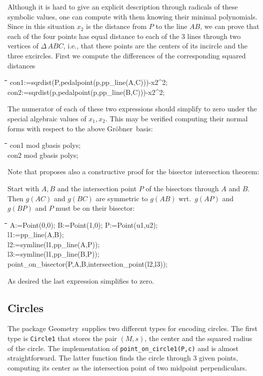 \documentclass{article}
\newenvironment{code}{\tt \begin{tabbing}
\hspace*{1cm}\=\hspace*{1cm}\=\hspace*{1cm}\=
\hspace*{1cm}\=\hspace*{1cm}\=\kill
}{\end{tabbing}}
\newcommand{\geo}{{\sc Geometry}}
\newcommand{\gr}{{Gr\"obner}}
\begin{document}
Although it is hard to give an explicit description through radicals
of these symbolic values, one can compute with them knowing their
minimal polynomials. Since in this situation $x_2$ is the distance
from $P$ to the line $AB$, we can prove that each of the four points
has equal distance to each of the 3 lines through two vertices of
$\Delta\,ABC$, i.e., that these points are the centers of its incircle
and the three excircles. First we compute the differences of the
corresponding squared distances
\begin{code}\>\+
con1:=sqrdist(P,pedalpoint(p,pp\_line(A,C)))-x2\^{}2;\\
con2:=sqrdist(p,pedalpoint(p,pp\_line(B,C)))-x2\^{}2;
\end{code}
The numerator of each of these two expressions should simplify to zero
under the special algebraic values of $x_1,x_2$. This may be verified
computing their normal forms with respect to the above \gr\ basis: 
\begin{code}\>\+
con1 mod gbasis polys;\\
con2 mod gbasis polys;
\end{code}
Note that \cite{Wu:94} proposes also a constructive proof for the
bisector intersection theorem:

Start with $A,B$ and the intersection point $P$ of the bisectors
through $A$ and $B$. Then $g(AC)$ and $g(BC)$ are symmetric to $g(AB)$
wrt.\ $g(AP)$ and $g(BP)$ and $P$ must be on their bisector:
\begin{code}\>\+
A:=Point(0,0); B:=Point(1,0); P:=Point(u1,u2);\\
l1:=pp\_line(A,B);\\
l2:=symline(l1,pp\_line(A,P));\\
l3:=symline(l1,pp\_line(B,P));\\[6pt]

point\_on\_bisector(P,A,B,intersection\_point(l2,l3));
\end{code}
As desired the last expression simplifies to zero.


\subsection{Circles}

The package \geo\ supplies two different types for encoding circles.
The first type is {\tt Circle1} that stores the pair $(M,s)$, the
center and the squared radius of the circle. The implementation of
{\tt point\_on\_circle1(P,c)} and 
is almost straightforward. The latter function finds the circle
through 3 given points, computing its center as the intersection point
of two midpoint perpendiculars.
\end{document}
